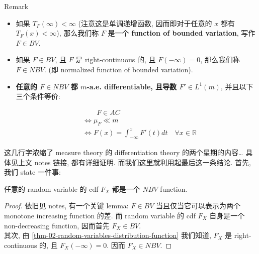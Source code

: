 \begin{qlremark}{Remark}
\begin{itemize}
  ~
\item
  如果 \(\mathit{T}_{\mathit{F}}(\infty) < \infty\) (注意这是单调递增函数, 因而即对于任意的 \(\mathit{x}\) 都有 \(\mathit{T}_{\mathit{F}}(\mathit{x}) < \infty\)), 那么我们称 \(\mathit{F}\) 是一个 \textbf{function of bounded variation}, 写作 \(\mathit{F} \in \mathit{B}\mathit{V}\).
\item
  如果 \(\mathit{F} \in \mathit{B}\mathit{V}\), 且 \(\mathit{F}\) 是 right-continuous 的, 且 \(\mathit{F}( - \infty) = 0\), 那么我们称 \(\mathit{F} \in \mathit{N}\mathit{B}\mathit{V}\). (即 normalized function of bounded variation).
\item
  \textbf{任意的 \(\mathit{F} \in \mathit{N}\mathit{B}\mathit{V}\) 都 \(\mathit{m}\)-a.e. differentiable, 且导数 \(\mathit{F}' \in \mathit{L}^{1}(\mathit{m})\)}, 并且以下三个条件等价:

  \[\begin{matrix}
   & {\quad\quad\mathit{F} \in \mathit{A}\mathit{C}} \\
   & {\Leftrightarrow\mathit{\mu}_{\mathit{F}} \ll \mathit{m}} \\
   & {\Leftrightarrow\mathit{F}(\mathit{x}) = \int_{- \infty}^{\mathit{x}}\mathit{F}'(\mathit{t})\mathit{d}\mathit{t}\quad\forall\mathit{x} \in \mathbb{R}}
  \end{matrix}\]
\end{itemize}

\end{qlremark}

这几行字浓缩了 measure theory 的 differentiation theory 的两个星期的内容\ldots{} 具体见上文 notes 链接, 都有详细证明. 而我们这里就利用起最后这一条结论. 首先, 我们 state 一件事:

\begin{lemma}{}

任意的 random variable 的 cdf \(\mathit{F}_{\mathit{X}}\) 都是一个 \(\mathit{N}\mathit{B}\mathit{V}\) function.

\end{lemma}

\begin{proof}

依旧见 notes, 有一个关键 lemma: \(\mathit{F} \in \mathit{B}\mathit{V}\) 当且仅当它可以表示为两个 monotone increasing function 的差. 而 random variable 的 cdf \(\mathit{F}_{\mathit{X}}\) 自身是一个 non-decreasing function, 因而首先 \(\mathit{F}_{\mathit{X}} \in \mathit{B}\mathit{V}\).\\
其次, 由 \ref{thm-02-random-variables-distribution-function} 我们知道, \(\mathit{F}_{\mathit{X}}\) 是 right-continuous 的, 且 \(\mathit{F}_{\mathit{X}}( - \infty) = 0\). 因而 \(\mathit{F}_{\mathit{X}} \in \mathit{N}\mathit{B}\mathit{V}\).

\end{proof}

